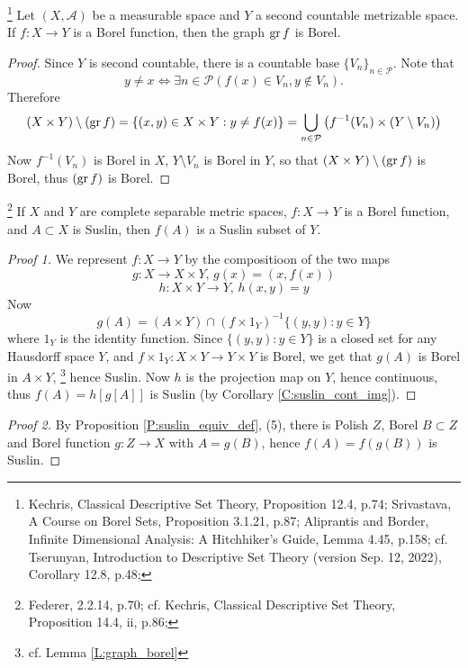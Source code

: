 \begin{lemma} \label{L:graph_borel}
\footnote{Kechris, Classical Descriptive Set Theory, Proposition 12.4, p.74;
  Srivastava, A Course on Borel Sets, Proposition 3.1.21, p.87; 
  Aliprantis and Border, Infinite Dimensional Analysis: A Hitchhiker's 
  Guide, Lemma 4.45, p.158;
  cf. Tserunyan, Introduction to Descriptive Set Theory (version Sep. 12,
  2022), Corollary 12.8, p.48; }
Let $(X,\mathcal{A})$ be a measurable space and $Y$ a second countable 
metrizable space. If $f:X\to Y$ is a Borel function, then the graph $\operatorname*{gr} f$
is Borel.
\end{lemma}
\begin{proof}
Since $Y$ is second countable, there is a countable base 
$\{V_n\}_{n\in\mathcal{P}}$. Note that
\[
  y\neq x \iff
    \exists n\in \mathcal{P} ( f(x)\in V_n, y\notin V_n ).
\]
Therefore
\[
 (X\times Y)\setminus (\operatorname*{gr} f) 
   = \{ (x,y)\in X\times Y: y\neq f(x) \}
   = \bigcup_{n\in\mathcal{P}} 
      \left( f^{-1}(V_n) \times (Y\setminus V_n) \right)
\]
Now $f^{-1}(V_n)$ is Borel in $X$, $Y\setminus V_n$ is Borel in $Y$, so that
$(X\times Y)\setminus (\operatorname*{gr} f)$ is Borel, thus $(\operatorname*{gr} f)$ is Borel.
\end{proof}


\begin{proposition} \label{P:borel_img_suslin}
\footnote{Federer, 2.2.14, p.70;
  cf. Kechris, Classical Descriptive Set Theory, Proposition 14.4, ii, p.86;
}
If $X$ and $Y$ are complete separable metric spaces, $f:X\to Y$ is a Borel
function, and $A\subset X$ is Suslin, then $f(A)$ is a Suslin subset of $Y$.
\end{proposition}
\begin{proof}[Proof 1]
We represent $f:X\to Y$ by the compositioon of the two maps
\[
  g:X\to X\times Y, \, g(x)=(x,f(x))
\]
\[
  h:X\times Y \to Y, \, h(x,y)=y
\]
Now 
\[
  g(A) = (A\times Y) \cap (f\times 1_Y)^{-1} \{(y,y):y\in Y\}
\]
where $1_Y$ is the identity function.
Since $\{(y,y):y\in Y\}$ is a closed set for any Hausdorff space $Y$, and 
$f\times 1_Y: X\times Y \to Y\times Y$ is Borel, we get that 
$g(A)$ is Borel in $A\times Y$, 
\footnote{cf. Lemma \ref{L:graph_borel}}
hence Suslin. Now $h$ is the projection
map on $Y$, hence continuous, thus $f(A)=h[g[A]]$ is Suslin (by Corollary
\ref{C:suslin_cont_img}).
\end{proof}
\begin{proof}[Proof 2]
By Proposition \ref{P:suslin_equiv_def}, (5), 
there is Polish $Z$, Borel $B\subset Z$ and Borel function 
$g:Z\to X$ with $A=g(B)$, hence $f(A)=f(g(B))$ is Suslin.
\end{proof}












